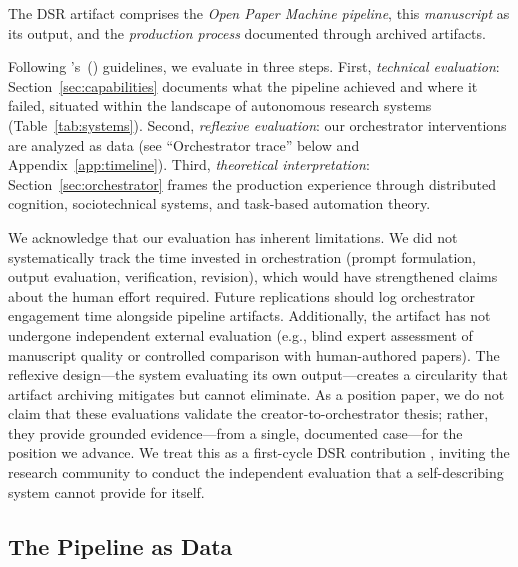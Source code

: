 \documentclass{article}
\begin{document}
The DSR artifact comprises the \textit{Open Paper Machine pipeline}, this \textit{manuscript} as its output, and the \textit{production process} documented through archived artifacts.

Following \citeauthor{hevner2004design}'s~(\citeyear{hevner2004design}) guidelines, we evaluate in three steps. First, \textit{technical evaluation}: Section~\ref{sec:capabilities} documents what the pipeline achieved and where it failed, situated within the landscape of autonomous research systems (Table~\ref{tab:systems}). Second, \textit{reflexive evaluation}: our orchestrator interventions are analyzed as data (see ``Orchestrator trace'' below and Appendix~\ref{app:timeline}). Third, \textit{theoretical interpretation}: Section~\ref{sec:orchestrator} frames the production experience through distributed cognition, sociotechnical systems, and task-based automation theory.

We acknowledge that our evaluation has inherent limitations. We did not systematically track the time invested in orchestration (prompt formulation, output evaluation, verification, revision), which would have strengthened claims about the human effort required. Future replications should log orchestrator engagement time alongside pipeline artifacts. Additionally, the artifact has not undergone independent external evaluation (e.g., blind expert assessment of manuscript quality or controlled comparison with human-authored papers). The reflexive design---the system evaluating its own output---creates a circularity that artifact archiving mitigates but cannot eliminate. As a position paper, we do not claim that these evaluations validate the creator-to-orchestrator thesis; rather, they provide grounded evidence---from a single, documented case---for the position we advance. We treat this as a first-cycle DSR contribution \citep{hevner2004design}, inviting the research community to conduct the independent evaluation that a self-describing system cannot provide for itself.


\subsection{The Pipeline as Data}
\end{document}
